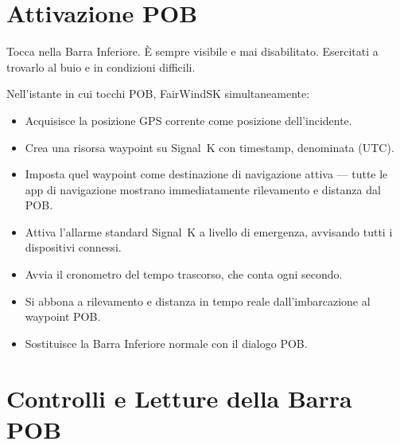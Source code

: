 \section{Attivazione POB}

Tocca  nella Barra Inferiore.
È sempre visibile e mai disabilitato.
Esercitati a trovarlo al buio e in condizioni difficili.

Nell'istante in cui tocchi POB, FairWindSK simultaneamente:

\begin{itemize}
  \item Acquisisce la posizione GPS corrente come posizione dell'incidente.
  \item Crea una risorsa waypoint su Signal~K con timestamp, denominata
         (UTC).
  \item Imposta quel waypoint come destinazione di navigazione attiva ---
        tutte le app di navigazione mostrano immediatamente rilevamento e distanza dal POB.
  \item Attiva l'allarme standard Signal~K  a livello di emergenza,
        avvisando tutti i dispositivi connessi.
  \item Avvia il cronometro del tempo trascorso, che conta ogni secondo.
  \item Si abbona a rilevamento e distanza in tempo reale dall'imbarcazione al waypoint POB.
  \item Sostituisce la Barra Inferiore normale con il dialogo POB.
\end{itemize}


\section{Controlli e Letture della Barra POB}


